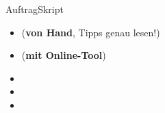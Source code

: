 \begin{frame}[fragile]{Auftrag}{Skript}
  \begin{itemize}
    \item {} (\textbf{von Hand}, Tipps genau lesen!)
    \item {} (\textbf{mit Online-Tool})
    \item {}
    \item {}
    \item {}
  \end{itemize}
\end{frame}

